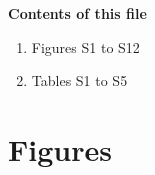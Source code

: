 \documentclass[jgrga]{agutexSI2019}
\begin{document}
\begin{article}

%
%



\noindent\textbf{Contents of this file}
\begin{enumerate}
\item Figures S1 to S12
\item Tables S1 to S5
\end{enumerate}


\clearpage

\section{Figures}


\end{article}
\end{document}
